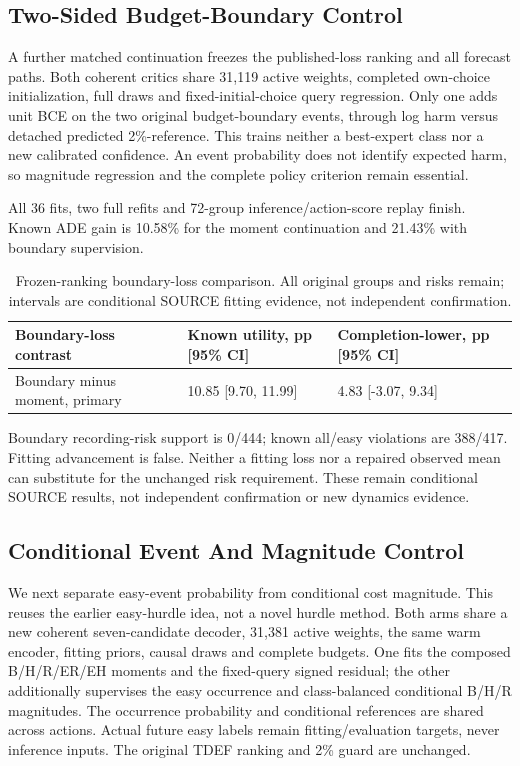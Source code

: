 \documentclass[10pt,twocolumn,letterpaper]{article}
\begin{document}
\subsection{Two-Sided Budget-Boundary Control}
A further matched continuation freezes the published-loss ranking and all forecast paths. Both coherent critics share 31,119 active weights, completed own-choice initialization, full draws and fixed-initial-choice query regression. Only one adds unit BCE on the two original budget-boundary events, through log harm versus detached predicted 2\%-reference. This trains neither a best-expert class nor a new calibrated confidence. An event probability does not identify expected harm, so magnitude regression and the complete policy criterion remain essential.

All 36 fits, two full refits and 72-group inference/action-score replay finish. Known ADE gain is 10.58\% for the moment continuation and 21.43\% with boundary supervision.

\begin{table}[!t]
\centering\small
\begin{tabularx}{\textwidth}{@{}XXX@{}}\toprule
Boundary-loss contrast & Known utility, pp [95\% CI] & Completion-lower, pp [95\% CI] \\
\midrule
Boundary minus moment, primary & 10.85 [9.70, 11.99] & 4.83 [-3.07, 9.34] \\
\bottomrule
\end{tabularx}
\caption{Frozen-ranking boundary-loss comparison. All original groups and risks remain; intervals are conditional SOURCE fitting evidence, not independent confirmation.}
\end{table}
Boundary recording-risk support is 0/444; known all/easy violations are 388/417. Fitting advancement is false. Neither a fitting loss nor a repaired observed mean can substitute for the unchanged risk requirement. These remain conditional SOURCE results, not independent confirmation or new dynamics evidence.

\subsection{Conditional Event And Magnitude Control}
We next separate easy-event probability from conditional cost magnitude. This reuses the earlier easy-hurdle idea, not a novel hurdle method. Both arms share a new coherent seven-candidate decoder, 31,381 active weights, the same warm encoder, fitting priors, causal draws and complete budgets. One fits the composed B/H/R/ER/EH moments and the fixed-query signed residual; the other additionally supervises the easy occurrence and class-balanced conditional B/H/R magnitudes. The occurrence probability and conditional references are shared across actions. Actual future easy labels remain fitting/evaluation targets, never inference inputs. The original TDEF ranking and 2\% guard are unchanged.
\end{document}
